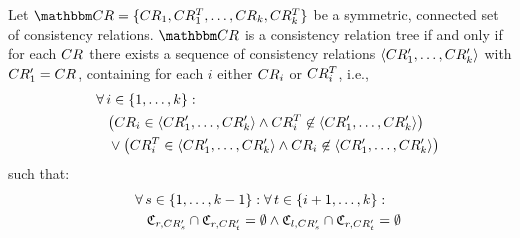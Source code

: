 \begin{lemma} \label{lemma:treehassequence}
    Let $\consistencyrelationset{CR} = \setted{\consistencyrelation{CR}{1}, \consistencyrelation{CR^T}{1}, \dots, \consistencyrelation{CR}{k}, \consistencyrelation{CR^T}{k}}$ be a symmetric, connected set of consistency relations.
    $\consistencyrelationset{CR}$ is a consistency relation tree if and only if for each $CR_{}$ there exists a sequence of consistency relations $\langle CR'_{1}, \dots, CR'_{k} \rangle$ with $CR'_{1} = CR_{}$, containing for each $i$ either $CR_{i}$ or $CR^T_{i}$, i.e.,
    \begin{align*}
        \formulaskip &
        \forall i \in \setted{1, \dots, k} :\\
        & \formulaskip 
        \bigl( \consistencyrelation{CR}{i} \in \tupled{\consistencyrelation{CR'}{1}, \dots, \consistencyrelation{CR'}{k}}
        \land \consistencyrelation{CR^T}{i} \not\in \tupled{\consistencyrelation{CR'}{1}, \dots, \consistencyrelation{CR'}{k}} \bigl)\\
        & \formulaskip 
        \lor \bigl(\consistencyrelation{CR^T}{i} \in \tupled{\consistencyrelation{CR'}{1}, \dots, \consistencyrelation{CR'}{k}}
        \land \consistencyrelation{CR}{i} \not\in \tupled{\consistencyrelation{CR'}{1}, \dots, \consistencyrelation{CR'}{k}} \bigl)
    \end{align*}
    such that:
    \begin{align*}
        \formulaskip &
        \forall s \in \setted{1, \dots, k-1} : \forall t \in \setted{i+1, \dots, k} : \\
        & \formulaskip
        \classtuple{C}{r,\consistencyrelation{CR'}{s}} \cap \classtuple{C}{r,\consistencyrelation{CR'}{t}} = \emptyset 
        \land
        \classtuple{C}{l,\consistencyrelation{CR'}{s}} \cap 
        \classtuple{C}{r,\consistencyrelation{CR'}{t}} = \emptyset
    \end{align*}
\end{lemma}

